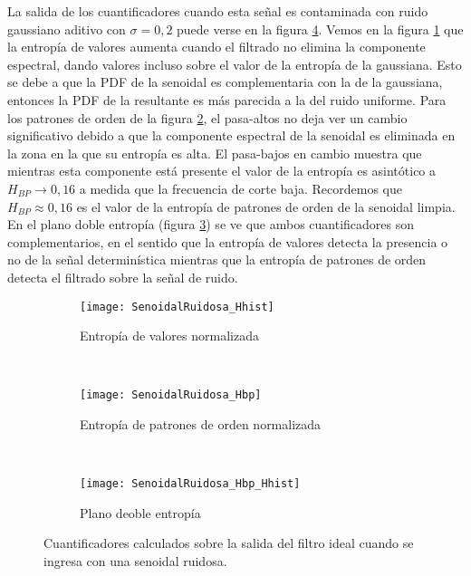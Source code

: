 La salida de los cuantificadores cuando esta señal es contaminada con ruido gaussiano aditivo con $\sigma=0,2$ puede verse en la figura \ref{fig:SenoidalRuidosa}. Vemos en la figura \ref{subfig:SenoidalRuidosa_Hhist} que la entropía de valores aumenta cuando el filtrado no elimina la componente espectral, dando valores incluso sobre el valor de la entropía de la gaussiana. Esto se debe a que la PDF de la senoidal es complementaria con la de la gaussiana, entonces la PDF de la resultante es más parecida a la del ruido uniforme.
Para los patrones de orden de la figura \ref{subfig:SenoidalRuidosa_Hbp}, el pasa-altos no deja ver un cambio significativo debido a que la componente espectral de la senoidal es eliminada en la zona en la que su entropía es alta.
El pasa-bajos en cambio muestra que mientras esta componente está presente el valor de la entropía es asintótico a $H_{BP}\to0,16$ a medida que la frecuencia de corte baja. Recordemos que $H_{BP}\approx0,16$ es el valor de la entropía de patrones de orden de la senoidal limpia.
En el plano doble entropía (figura \ref{subfig:SenoidalRuidosa_HbpHhist}) se ve que ambos cuantificadores son complementarios, en el sentido que la entropía de valores detecta la presencia o no de la señal determinística mientras que la entropía de patrones de orden detecta el filtrado sobre la señal de ruido.

\begin{figure}[h]
    \centering
    \begin{subfigure}[t]{0.32\textwidth}
        \texttt{[image: SenoidalRuidosa\_Hhist]}
        \caption{Entropía de valores normalizada}
        \label{subfig:SenoidalRuidosa_Hhist}
    \end{subfigure}
    ~ %
    \begin{subfigure}[t]{0.32\textwidth}
        \texttt{[image: SenoidalRuidosa\_Hbp]}
        \caption{Entropía de patrones de orden normalizada}
        \label{subfig:SenoidalRuidosa_Hbp}
    \end{subfigure}
    ~ %
    \begin{subfigure}[t]{0.32\textwidth}
        \texttt{[image: SenoidalRuidosa\_Hbp\_Hhist]}
        \caption{Plano deoble entropía}
        \label{subfig:SenoidalRuidosa_HbpHhist}
    \end{subfigure}
    \caption{Cuantificadores calculados sobre la salida del filtro ideal cuando se ingresa con una senoidal ruidosa.}\label{fig:SenoidalRuidosa}
\end{figure}

